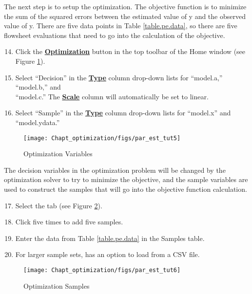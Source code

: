 The next step is to setup the optimization. The objective function is to minimize the sum of the squared errors between the estimated value of y and the observed value of y. There are five data points in Table \ref{table.pe.data}, so there are five flowsheet evaluations that need to go into the calculation of the objective.

\begin{enumerate}
	\setcounter{enumi}{13}
	\item Click the \textbf{\underline{Optimization}} button in the top toolbar of the Home window (see Figure \ref{fig.pe.tut5}).
	\item Select ``Decision'' in the \textbf{\underline{Type}} column drop-down lists for ``model.a,'' ``model.b,'' and \\``model.c.'' The \textbf{\underline{Scale}} column will automatically be set to linear.
	\item Select ``Sample'' in the \textbf{\underline{Type}} column drop-down lists for ``model.x'' and ``model.ydata.''
\end{enumerate}

\begin{figure}[H]
	\begin{center}
		\texttt{[image: Chapt\_optimization/figs/par\_est\_tut5]}
		\caption{Optimization Variables}
		\label{fig.pe.tut5}
	\end{center}
\end{figure}

The decision variables in the optimization problem will be changed by the optimization solver to try to minimize the objective, and the sample variables are used to construct the samples that will go into the objective function calculation.
\begin{enumerate}
	\setcounter{enumi}{16}
	\item Select the  tab (see Figure \ref{fig.pe.tut6}).
	\item Click  five times to add five samples.
	\item Enter the data from Table \ref{table.pe.data} in the Samples table.
	\item For larger sample sets,  has an option to load from a CSV file.
\end{enumerate}

\begin{figure}[H]
	\begin{center}
		\texttt{[image: Chapt\_optimization/figs/par\_est\_tut6]}
		\caption{Optimization Samples}
		\label{fig.pe.tut6}
	\end{center}
\end{figure}

